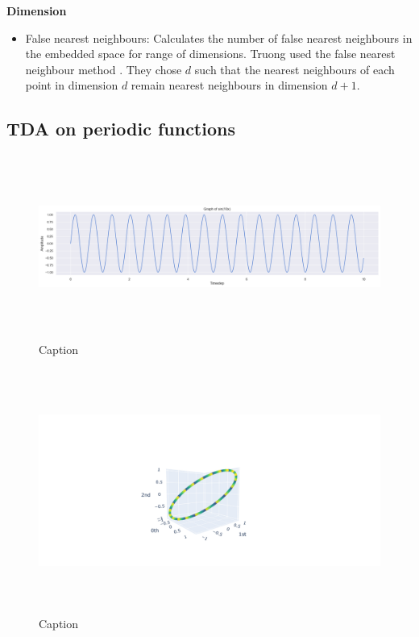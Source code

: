 \documentclass{article}
\begin{document}
\textbf{Dimension}
\begin{itemize}
    \item False nearest neighbours: Calculates the number of false nearest neighbours in the embedded space for range of dimensions. Truong \cite{truong2017exploration} used the false nearest neighbour method \cite{Kennel19923403}. They chose $d$ such that the nearest neighbours of each point in dimension $d$ remain nearest neighbours in dimension $d+1$. 
\end{itemize}



\clearpage

\subsection{TDA on periodic functions}
\begin{figure}[h!]
    \centering
    \includegraphics[width = 16cm, height = 6cm]{sin(10x).png}
    \caption{Caption}
    \label{fig:enter-label}
\end{figure}

\begin{figure}[h!]
    \centering
    \includegraphics[width=16cm, height=8cm]{pointcloud sin(10x).png}
    \caption{Caption}
    \label{fig:enter-label}
\end{figure}
\end{document}
